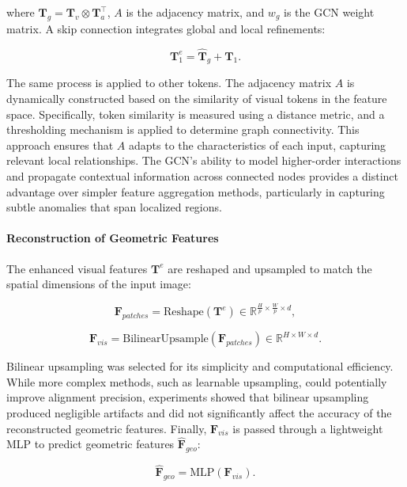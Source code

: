 \noindent where $\mathbf{T}_g = \mathbf{T}_v \otimes \mathbf{T}_a^\top$, $A$ is the adjacency matrix, and $w_g$ is the GCN weight matrix. A skip connection integrates global and local refinements:

\begin{equation}
\mathbf{T}_1^e = \hat{\mathbf{T}}_g + \mathbf{T}_1.
\end{equation}

\noindent The same process is applied to other tokens. The adjacency matrix $A$ is dynamically constructed based on the similarity of visual tokens in the feature space. Specifically, token similarity is measured using a distance metric, and a thresholding mechanism is applied to determine graph connectivity. This approach ensures that $A$ adapts to the characteristics of each input, capturing relevant local relationships. The GCN's ability to model higher-order interactions and propagate contextual information across connected nodes provides a distinct advantage over simpler feature aggregation methods, particularly in capturing subtle anomalies that span localized regions.

\paragraph*{Reconstruction of Geometric Features}
The enhanced visual features $\mathbf{T}^e$ are reshaped and upsampled to match the spatial dimensions of the input image:

\begin{equation}
\mathbf{F}_{patches} = \text{Reshape}(\mathbf{T}^e) \in \mathbb{R}^{\frac{H}{p} \times \frac{W}{p} \times d},
\end{equation}

\begin{equation}
\mathbf{F}_{vis} = \text{BilinearUpsample}(\mathbf{F}_{patches}) \in \mathbb{R}^{H \times W \times d}.
\end{equation}

\noindent Bilinear upsampling was selected for its simplicity and computational efficiency. While more complex methods, such as learnable upsampling, could potentially improve alignment precision, experiments showed that bilinear upsampling produced negligible artifacts and did not significantly affect the accuracy of the reconstructed geometric features. Finally, $\mathbf{F}_{vis}$ is passed through a lightweight MLP to predict geometric features $\hat{\mathbf{F}}_{geo}$:

\begin{equation}
\hat{\mathbf{F}}_{geo} = \text{MLP}(\mathbf{F}_{vis}).
\end{equation}

